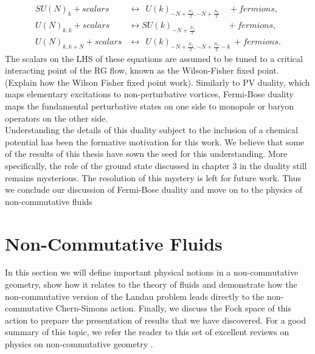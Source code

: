             \begin{align}
                SU(N)_k + scalars &\longleftrightarrow \ \ U(k)_{-N +\frac{N_f}{2}, -N + \frac{N_f}{2}} \quad + fermions,  \\
                U(N)_{k,k} + scalars &\longleftrightarrow SU(k)_{-N +\frac{N_f}{2}}\qquad \ \ \ \quad+ fermions,  \\
                U(N)_{k,k+N} + scalars &\longleftrightarrow \ \ U(k)_{-N +\frac{N_f}{2}, -N + \frac{N_f}{2}-k} \ + fermions.  
            \end{align}
            The scalars on the LHS of these equations are assumed to be tuned to a critical interacting point of the RG flow, known as the Wilson-Fisher fixed point. (Explain how the Wilson Fisher fixed point work). Similarly to PV duality, which maps elementary excitations to non-perturbative vortices, Fermi-Bose duality maps the fundamental perturbative states on one side to monopole or baryon operators on the other side. \\
            \indent Understanding the details of this duality subject to the inclusion of a chemical potential has been the formative motivation for this work. We believe that some of the results of this thesis have sown the seed for this understanding. More specifically, the role of the ground state discussed in chapter 3 in the duality still remains mysterious. The resolution of this mystery is left for future work. Thus we conclude our discussion of Fermi-Bose duality and move on to the physics of non-commutative fluids
%
        \section{Non-Commutative Fluids}
    In this section we will define important physical notions in a non-commutative geometry, show how it relates to the theory of fluids and demonstrate how the non-commutative version of the Landau problem leads directly to the non-commutative Chern-Simons action. Finally, we discuss the Fock space of this action to prepare the presentation of results that we have discovered. For a good summary of this topic, we refer the reader to this set of excellent reviews on physics on non-commutative geometry \cite{0706.1095, hep-th/0109162, hep-th/0106048}.

